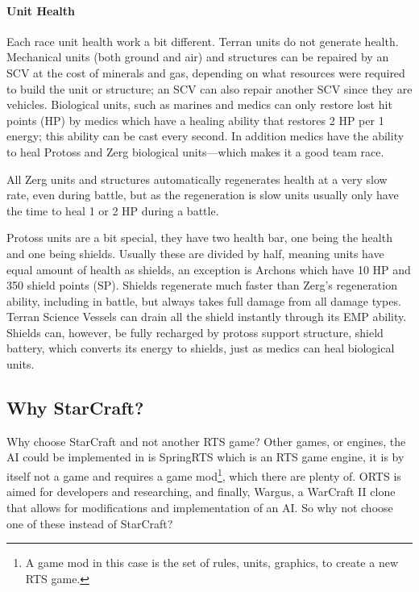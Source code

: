 \paragraph{Unit Health}
Each race unit health work a bit different. Terran units do not generate health. Mechanical units (both ground and air) and structures can be repaired by an SCV at the cost of minerals and gas, depending on what resources were required to build the unit or structure; an SCV can also repair another SCV since they are vehicles. Biological units, such as marines and medics can only restore lost hit points (HP) by medics which have a healing ability that restores 2 HP per 1 energy; this ability can be cast every second. In addition medics have the ability to heal Protoss and Zerg biological units—which makes it a good team race.

All Zerg units and structures automatically regenerates health at a very slow rate, even during battle, but as the regeneration is slow units usually only have the time to heal 1 or 2 HP during a battle.

Protoss units are a bit special, they have two health bar, one being the health and one being shields. Usually these are divided by half, meaning units have equal amount of health as shields, an exception is Archons which have 10 HP and 350 shield points (SP). Shields regenerate much faster than Zerg’s regeneration ability, including in battle, but always takes full damage from all damage types. Terran Science Vessels can drain all the shield instantly through its EMP ability. Shields can, however, be fully recharged by protoss support structure, shield battery, which converts its energy to shields, just as medics can heal biological units.

\subsection{Why StarCraft?}
Why choose StarCraft and not another RTS game? Other games, or engines, the AI could be implemented in is SpringRTS\cite{springrts} which is an RTS game engine, it is by itself not a game and requires a game mod\footnote{A game mod in this case is the set of rules, units, graphics, to create a new RTS game.}, which there are plenty of. ORTS\cite{orts} is aimed for developers and researching, and finally, Wargus\cite{wargus}, a WarCraft II clone that allows for modifications and implementation of an AI. So why not choose one of these instead of StarCraft?

